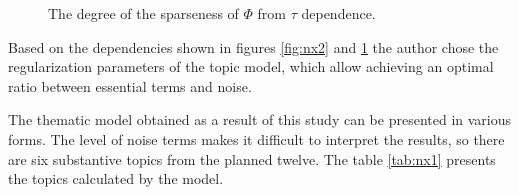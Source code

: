 \documentclass[12pt]{report}
\theoremstyle{definition}
\begin{document}
\begin{figure}
\begin{minipage}{.5\textwidth}
			\caption{The degree of the sparseness of $\Phi$ from $\tau$ dependence.}
		\label{fig:nx3}
	\end{minipage}  
\end{figure}

Based on the dependencies shown in figures  \ref{fig:nx2} and \ref{fig:nx3} the author chose the regularization parameters of the topic model, which allow achieving an optimal ratio between essential terms and noise.

The thematic model obtained as a result of this study can be presented in various forms. The level of noise terms makes it difficult to interpret the results, so there are six substantive topics from the planned twelve. 
The table \ref{tab:nx1} presents the topics calculated by the model.

\begin{table}[H]
	\centering
	\caption{Fragment of the matrix $\Phi$ for terms with maximum probabilities.}
	\label{tab:nx1}
\end{table}
\end{document}
